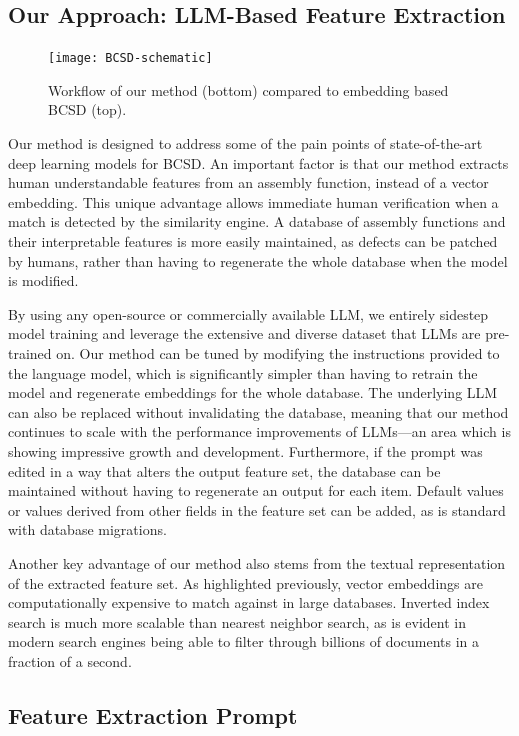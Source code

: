 \subsection{Our Approach: LLM-Based Feature Extraction}

\begin{figure}
\centerline{\texttt{[image: BCSD-schematic]}}
\caption{Workflow of our method (bottom) compared to embedding based BCSD (top).}
\label{BCSD-workflow}
\end{figure}


Our method is designed to address some of the pain points of state-of-the-art deep learning models for BCSD.
An important factor is that our method extracts human understandable features from an assembly function, instead
of a vector embedding. This unique advantage allows immediate human verification when a match is detected by the similarity
engine. A database of assembly functions and their interpretable features is more easily maintained, as defects can
be patched by humans, rather than having to regenerate the whole database when the model is modified.

By using any open-source or commercially available LLM, we entirely sidestep model training and leverage the extensive
and diverse dataset that LLMs are pre-trained on. Our method can be tuned by modifying the instructions provided to
the language model, which is significantly simpler than having to retrain the model and regenerate embeddings for the whole database.
The underlying LLM can also be replaced without invalidating the database, meaning that our method continues
to scale with the performance improvements of LLMs---an area which is showing impressive growth and development. Furthermore, if
the prompt was edited in a way that alters the output feature set, the database can be maintained without
having to regenerate an output for each item. Default values or values derived from other fields in the feature set can be added,
as is standard with database migrations.

Another key advantage of our method also stems from the textual representation of the extracted feature set. As highlighted
previously, vector embeddings are computationally expensive to match against in large databases. Inverted index search is much
more scalable than nearest neighbor search, as is evident in modern search engines being able to filter through billions of documents
in a fraction of a second.

\subsection{Feature Extraction Prompt}

